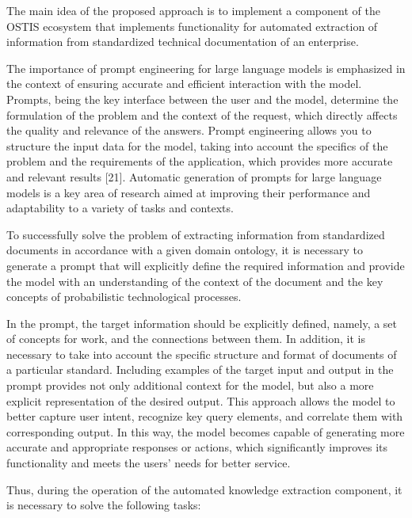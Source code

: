 \documentclass [11pt,a4paper]{article}
\begin{document}
\begin{multicols}{2}
\par The main idea of the proposed approach is to implement a component of the OSTIS ecosystem that
implements functionality for automated extraction of
information from standardized technical documentation
of an enterprise.
\par The importance of prompt engineering for large language models is emphasized in the context of ensuring accurate and efficient interaction with the model. Prompts,
being the key interface between the user and the model,
determine the formulation of the problem and the context
of the request, which directly affects the quality and
relevance of the answers. Prompt engineering allows you
to structure the input data for the model, taking into
account the specifics of the problem and the requirements
of the application, which provides more accurate and
relevant results [21]. Automatic generation of prompts for
large language models is a key area of research aimed at
improving their performance and adaptability to a variety
of tasks and contexts.
\par To successfully solve the problem of extracting information from standardized documents in accordance with
a given domain ontology, it is necessary to generate a
prompt that will explicitly define the required information and provide the model with an understanding of
the context of the document and the key concepts of
probabilistic technological processes.
\par In the prompt, the target information should be explicitly defined, namely, a set of concepts for work, and the connections between them. In addition, it is necessary
to take into account the specific structure and format of
documents of a particular standard. Including examples
of the target input and output in the prompt provides
not only additional context for the model, but also a
more explicit representation of the desired output. This
approach allows the model to better capture user intent,
recognize key query elements, and correlate them with
corresponding output. In this way, the model becomes
capable of generating more accurate and appropriate
responses or actions, which significantly improves its
functionality and meets the users’ needs for better service.
\par Thus, during the operation of the automated knowledge extraction component, it is necessary to solve the
following tasks:


\end{multicols}
\end{document}
